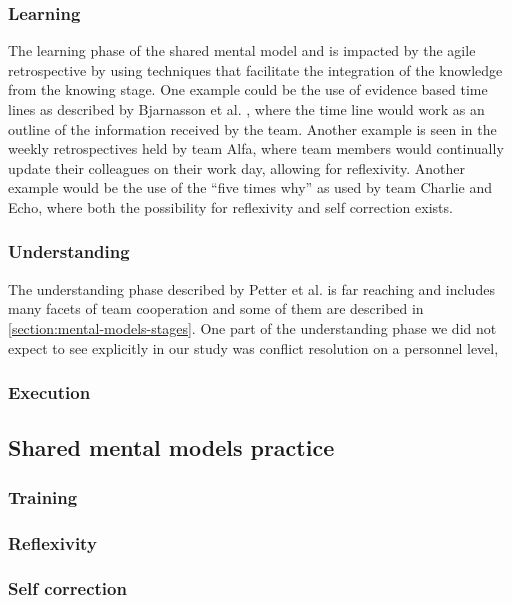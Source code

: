 \subsubsection{Learning}
The learning phase of the shared mental model and is impacted by the agile retrospective by using techniques that facilitate the integration of the knowledge from the knowing stage. One example could be the use of evidence based time lines as described by Bjarnasson et al. \cite{Bjarnason2012}, where the time line would work as an outline of the information received by the team. Another example is seen in the weekly retrospectives held by team Alfa, where team members would continually update their colleagues on their work day, allowing for reflexivity. Another example would be the use of the ``five times why'' as used by team Charlie and Echo, where both the possibility for reflexivity and self correction exists.
 
\subsubsection{Understanding}
The understanding phase described by Petter et al. \cite{Petter2013} is far reaching and includes many facets of team cooperation and some of them are described in \autoref{section:mental-models-stages}. One part of the understanding phase we did not expect to see explicitly in our study was conflict resolution on a personnel level,  

\subsubsection{Execution}

\subsection{Shared mental models practice}

\subsubsection{Training}

\subsubsection{Reflexivity}
	
\subsubsection{Self correction}

